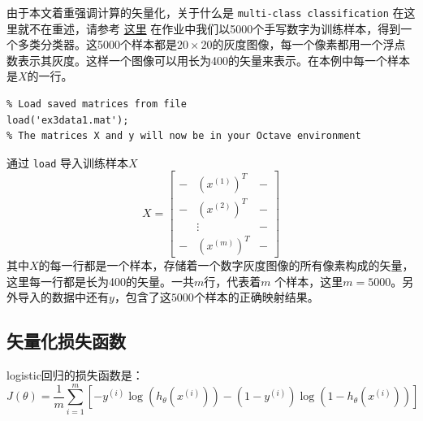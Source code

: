 \documentclass[10pt,a4paper,UTF8]{article}
\begin{document}
由于本文着重强调计算的矢量化，关于什么是 \texttt{multi-class classification} 在这里就不在重述，请参考 \href{week-04-neural-networks.org}{这里} 在作业中我们以5000个手写数字为训练样本，得到一个多类分类器。这5000个样本都是\(20\times 20\)的灰度图像，每一个像素都用一个浮点数表示其灰度。这样一个图像可以用长为400的矢量来表示。在本例中每一个样本是\(X\)的一行。
\lstset{language=matlab,label= ,caption= ,captionpos=b,numbers=none}
\begin{lstlisting}
% Load saved matrices from file
load('ex3data1.mat');
% The matrices X and y will now be in your Octave environment
\end{lstlisting}
通过 \texttt{load} 导入训练样本\(X\)
\begin{equation}
\label{eq:1}
X =
\begin{bmatrix}
- & (x^{(1)})^{T} & - \\
- & (x^{(2)})^{T} & - \\
    &    \vdots     & - \\
- & (x^{(m)})^{T} & -
\end{bmatrix}
\end{equation}
其中\(X\)的每一行都是一个样本，存储着一个数字灰度图像的所有像素构成的矢量，这里每一行都是长为400的矢量。一共\(m\)行，代表着\(m\) 个样本，这里\(m=5000\)。另外导入的数据中还有\(y\)，包含了这\(5000\)个样本的正确映射结果。

\subsection{矢量化损失函数}
\label{sec:org6c939db}

logistic回归的损失函数是：
\begin{equation}
\label{eq:2}
J(\theta) = \frac{1}{m} \sum_{i=1}^{m} [ -y^{(i)}\log (h_{\theta}(x^{(i)})) - (1-y^{(i)})\log(1-h_{\theta}(x^{(i)})) ]
\end{equation}
\end{document}
